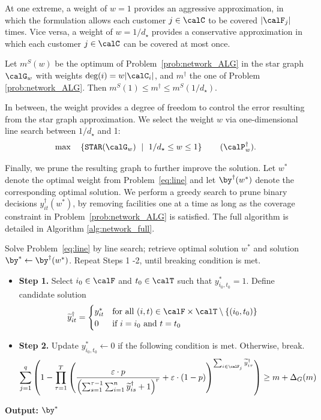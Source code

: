 \documentclass[blindrev]{informs3noheader}
\begin{document}
At one extreme, a weight of $w=1$ provides an aggressive approximation, in which the formulation allows each customer $j\in\calC$ to be covered $|\calF_j|$ times. Vice versa, a weight of $w=1/d_\star$ provides a conservative approximation in which each customer $j\in\calC$ can be covered at most once. 
\begin{corollary}\label{cor:heuristic}
Let $m^S(w)$ be the optimum of Problem~\eqref{prob:network_ALG} in the star graph $\calG_w$ with weights $\text{deg}(i)=w|\calC_i|$, and $m^\dagger$ the one of Problem \eqref{prob:network_ALG}. Then $m^S(1) \leq m^\dagger \leq m^S(1/d_\star)$.
\end{corollary}

In between, the weight provides a degree of freedom to control the error resulting from the star graph approximation. We select the weight $w$ via one-dimensional line search between $1/d_\star$ and 1:
\begin{equation}\label{eq:line}
\max\quad\left\{\texttt{STAR}(\calG_w)\ \mid\ 1/d_\star \leq w \leq 1\right\}\tag{$\calP_w^\dagger$}.
\end{equation}

Finally, we prune the resulting graph to further improve the solution. Let $w^*$ denote the optimal weight from Problem~\eqref{eq:line} and let $\by^\dagger(w^*)$ denote the corresponding optimal solution. We perform a greedy search to prune binary decisions $y_{it}^{\dagger}(w^*)$, by removing facilities one at a time as long as the coverage constraint in Problem~\eqref{prob:network_ALG} is satisfied. The full algorithm is detailed in Algorithm \ref{alg:network_full}. 

\begin{algorithm} [h!]
\caption{Algorithm to solve Problem~\eqref{prob:network_ALG} in a general graph $\calG$.}\small
\label{alg:network_full}
\begin{algorithmic}
\State Solve Problem~\eqref{eq:line} by line search; retrieve optimal solution $w^*$ and solution $\by^*\gets\by^\dagger(w^*)$.
\State Repeat Steps 1 -2, until breaking condition is met.
\begin{itemize}
\item[] \textbf{Step 1.} Select $i_0\in\calF$ and $t_0\in\calT$ such that $y^*_{i_0,t_0}=1$. Define candidate solution
$$\widetilde y_{it}^\dagger=\begin{cases}
    y_{it}^*&\text{for all $(i,t)\in\calF\times\calT\setminus\{(i_0,t_0)\}$}\\
    0&\text{if $i=i_0$ and $t=t_0$}
\end{cases}$$
\item[] \textbf{Step 2.} Update $y^*_{i_0,t_0}\gets0$ if the following condition is met. Otherwise, break.
$$\sum_{j=1}^q \left(1-\prod_{\tau=1}^T \left(\frac{\varepsilon\cdot p}{\left(\sum_{s=1}^{\tau-1} \sum_{i=1}^n \widetilde y_{is}^\dagger +1\right)^r}+\varepsilon\cdot(1-p)\right)^{\sum_{i \in \calF_j} \widetilde y_{i\tau}^\dagger}\right) \geq m+\Delta_G(m)$$
\end{itemize}
\item \textbf{Output:} $\by^*$
\end{algorithmic}
\end{algorithm}
\end{document}
